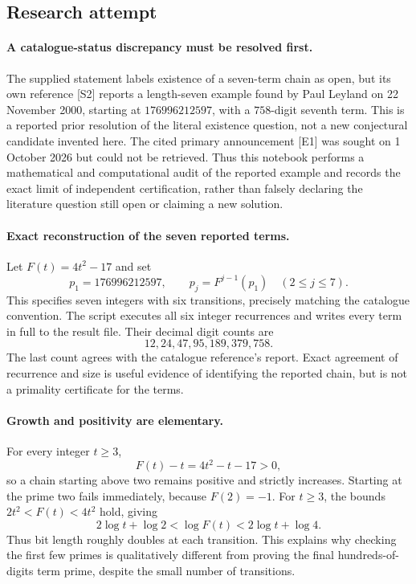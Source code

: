 \documentclass[11pt,a4paper]{article}
\begin{document}
\subsection{Research attempt}

\paragraph{A catalogue-status discrepancy must be resolved first.}
The supplied statement labels existence of a seven-term chain as open,
but its own reference [S2] reports a length-seven example found by
Paul Leyland on 22 November 2000, starting at $176996212597$, with
a $758$-digit seventh term. This is a reported prior resolution of the
literal existence question, not a new conjectural candidate invented
here. The cited primary announcement [E1] was sought on 1 October 2026
but could not be retrieved. Thus this notebook performs a mathematical
and computational audit of the reported example and records the exact
limit of independent certification, rather than falsely declaring the
literature question still open or claiming a new solution.

\paragraph{Exact reconstruction of the seven reported terms.}
Let $F(t)=4t^2-17$ and set
\[
 p_1=176996212597,\qquad p_j=F^{j-1}(p_1)\quad(2\le j\le7).
\]
This specifies seven integers with six transitions, precisely matching
the catalogue convention. The script executes all six integer
recurrences and writes every term in full to the result file. Their
decimal digit counts are
\[
                         12,24,47,95,189,379,758.
\]
The last count agrees with the catalogue reference's report. Exact
agreement of recurrence and size is useful evidence of identifying the
reported chain, but is not a primality certificate for the terms.

\paragraph{Growth and positivity are elementary.}
For every integer $t\ge3$,
\[
 F(t)-t=4t^2-t-17>0,
\]
so a chain starting above two remains positive and strictly increases.
Starting at the prime two fails immediately, because $F(2)=-1$.
For $t\ge3$, the bounds $2t^2<F(t)<4t^2$ hold, giving
\[
 2\log t+\log2<\log F(t)<2\log t+\log4.
\]
Thus bit length roughly doubles at each transition. This explains why
checking the first few primes is qualitatively different from proving
the final hundreds-of-digits term prime, despite the small number of
transitions.
\end{document}
